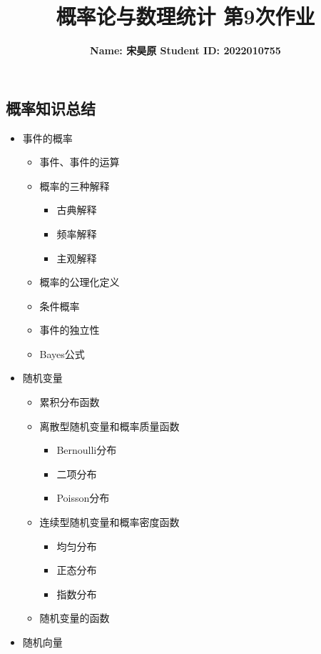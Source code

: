 \documentclass{article}
\title{\bf\Large  概率论与数理统计 第9次作业}
\author{\bf Name: 宋昊原 \qquad Student ID: 2022010755}
\begin{document}
\begin{CJK}{UTF8}{gbsn}
\maketitle
\section{概率知识总结}
\begin{itemize}
    \item 事件的概率
    \begin{itemize}
        \item 事件、事件的运算
        \item 概率的三种解释
        \begin{itemize}
            \item 古典解释
            \item 频率解释
            \item 主观解释
        \end{itemize}
        \item 概率的公理化定义
        \item 条件概率
        \item 事件的独立性
        \item Bayes公式
    \end{itemize}
    \item 随机变量
    \begin{itemize}
        \item 累积分布函数
        \item 离散型随机变量和概率质量函数
        \begin{itemize}
            \item Bernoulli分布
            \item 二项分布
            \item Poisson分布
        \end{itemize}
        \item 连续型随机变量和概率密度函数
        \begin{itemize}
            \item 均匀分布
            \item 正态分布
            \item 指数分布
        \end{itemize}
        \item 随机变量的函数
    \end{itemize}
    \item 随机向量
    \begin{itemize}

\end{itemize}
\end{itemize}
\end{CJK}
\end{document}
